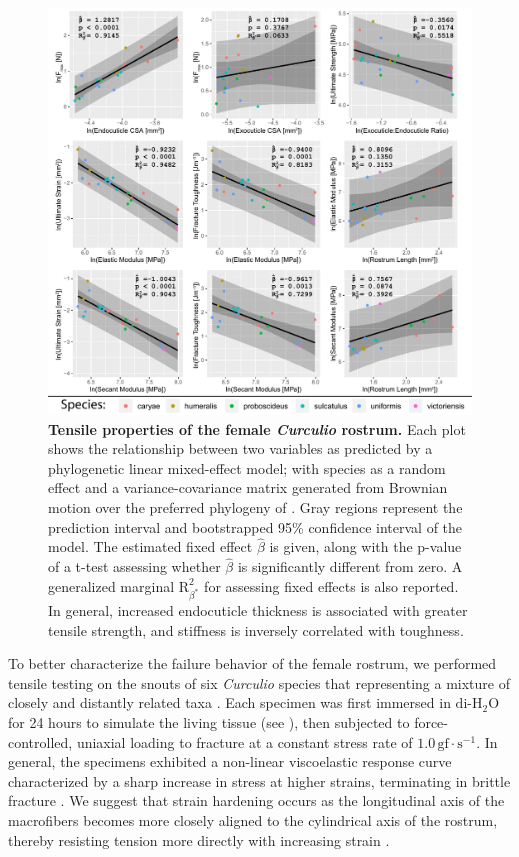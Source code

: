 \documentclass[twocolumn, linenumbers, superscriptaddress, nofootinbib]{revtex4-1}
\begin{document}
		\begin{figure}
			\centering
			\includegraphics[width=180mm]{fig4.pdf}
			\caption{\textbf{Tensile properties of the female \textit{Curculio} rostrum.}
				Each plot shows the relationship between two variables as predicted by a phylogenetic linear mixed-effect model; with species as a random effect and a variance-covariance matrix generated from Brownian motion over the preferred phylogeny of \cite{Bonal2016}.
				Gray regions represent the prediction interval and bootstrapped 95\% confidence interval of the model.
				The estimated fixed effect $\hat{\beta}$ is given, along with the p-value of a t-test assessing whether $\hat{\beta}$ is significantly different from zero.
				A generalized marginal $\text{R}^2_{\beta^*}$ for assessing fixed effects is also reported.
				In general, increased endocuticle thickness is associated with greater tensile strength, and stiffness is inversely correlated with toughness.
			}
			\label{fig::tensile}
		\end{figure}		
	
		To better characterize the failure behavior of the female rostrum, we performed tensile testing on the snouts of six \textit{Curculio} species that representing a mixture of closely and distantly related taxa \cite{Hughes2004phylo, Hughes2004eco, Bonal2016, Bonal2011}.
		Each specimen was first immersed in $\text{di-H}_2\text{O}$ for 24 hours to simulate the living tissue (see \cite{Klocke2011}), then subjected to force-controlled, uniaxial loading to fracture at a constant stress rate of $1.0\,\text{gf}\cdot\text{s}^{-1}$.
		In general, the specimens exhibited a non-linear viscoelastic response curve characterized by a sharp increase in stress at higher strains, terminating in brittle fracture \cite{Mihai2017}.
		We suggest that strain hardening occurs as the longitudinal axis of the macrofibers becomes more closely aligned to the cylindrical axis of the rostrum, thereby resisting tension more directly with increasing strain \cite{Munster2013}.
			
\end{document}
